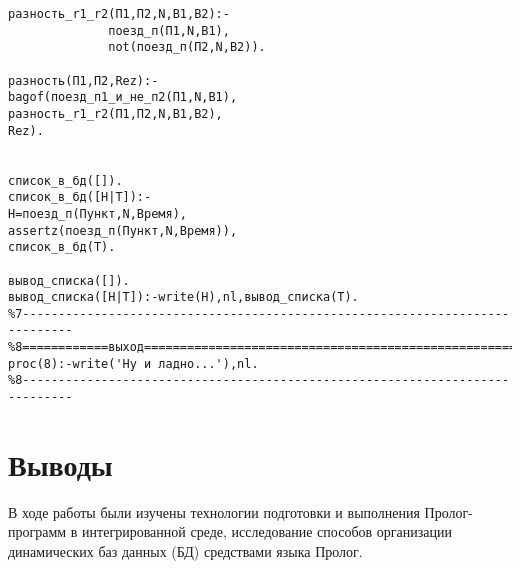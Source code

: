 \documentclass[a4paper,14pt]{extarticle}
\begin{document}
\begin{lstlisting}
разность_r1_r2(П1,П2,N,В1,В2):- 
              поезд_п(П1,N,В1), 
              not(поезд_п(П2,N,В2)). 
  
разность(П1,П2,Rez):- 
bagof(поезд_п1_и_не_п2(П1,N,В1), 
разность_r1_r2(П1,П2,N,В1,В2), 
Rez). 
  
  
список_в_бд([]). 
список_в_бд([H|T]):- 
H=поезд_п(Пункт,N,Время), 
assertz(поезд_п(Пункт,N,Время)), 
список_в_бд(T). 
  
вывод_списка([]). 
вывод_списка([H|T]):-write(H),nl,вывод_списка(T). 
%7----------------------------------------------------------------------------- 
%8============выход============================================================ 
proc(8):-write('Ну и ладно...'),nl. 
%8-----------------------------------------------------------------------------  
\end{lstlisting}

\section*{Выводы}
В ходе работы были изучены технологии подготовки и выполнения Пролог-программ в
интегрированной среде, исследование способов организации динамических баз данных
(БД) средствами языка Пролог.
\end{document}
